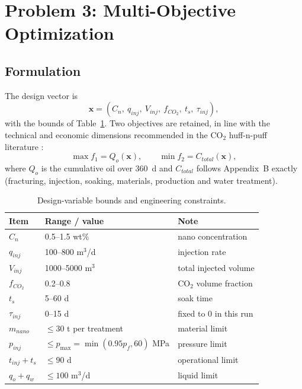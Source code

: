 \section{Problem 3: Multi-Objective Optimization}

\subsection{Formulation}

The design vector is
\begin{equation}
\mathbf x=\left(C_n,\ q_{inj},\ V_{inj},\ f_{CO_2},\ t_s,\ \tau_{inj}\right),
\label{eq:design}
\end{equation}
with the bounds of Table~\ref{tbl:bounds}. Two objectives are retained, in
line with the technical and economic dimensions recommended in the CO$_2$
huff-n-puff literature \cite{p3-01,p3-02}:
\begin{equation}
\max f_1=Q_o(\mathbf x),\qquad \min f_2=C_{total}(\mathbf x),
\label{eq:objectives}
\end{equation}
where $Q_o$ is the cumulative oil over 360~d and $C_{total}$ follows
Appendix~B exactly (fracturing, injection, soaking, materials, production and
water treatment).

\begin{table}[h!t]
\centering
\caption{Design-variable bounds and engineering constraints.}
\label{tbl:bounds}
\small
\begin{tabular}{lll}
\toprule[1.5pt]
Item & Range / value & Note\\
\midrule[1pt]
$C_n$ & 0.5--1.5 wt\% & nano concentration\\
$q_{inj}$ & 100--800 m$^3$/d & injection rate\\
$V_{inj}$ & 1000--5000 m$^3$ & total injected volume\\
$f_{CO_2}$ & 0.2--0.8 & CO$_2$ volume fraction\\
$t_s$ & 5--60 d & soak time\\
$\tau_{inj}$ & 0--15 d & fixed to $0$ in this run\\
$m_{nano}$ & $\le30$ t per treatment & material limit\\
$p_{inj}$ & $\le p_{\max}=\min(0.95p_f,60)$ MPa & pressure limit\\
$t_{inj}+t_s$ & $\le90$ d & operational limit\\
$q_o+q_w$ & $\le100$ m$^3$/d & liquid limit\\
\bottomrule[1.5pt]
\end{tabular}
\end{table}

